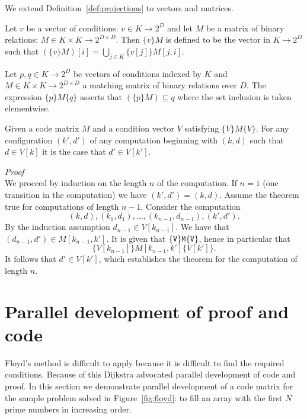 \documentclass[preprint,11pt]{elsarticle}
\begin{document}
We extend Definition~\ref{def:projections}
to vectors and matrices.
\begin{definition}\label{def:projVec}
Let $v$ be a vector of conditions: $v \in K \to 2^D$
and let $M$ be a matrix of binary relations:
$M \in K\times K \to 2^{D\times D}$.
Then $\{v\}M$ is defined to be the vector in $K \to 2^D$
such that
$(\{v\}M)[i] = \bigcup_{j\in K}\{v[j]\}M[j,i]$.  
\end{definition}

\begin{definition}
\label{def:braKet}
Let $p,q \in K \to 2^D$ be vectors of conditions
indexed by $K$
and $M \in K\times K \to 2^{D\times D}$
a matching matrix of binary relations over $D$.
The expression $\{p\}M\{q\}$
asserts that
$(\{p\}M) \subseteq q$
where the set inclusion is taken elementwise.
\end{definition}

\begin{theorem}\label{thm:Floyd}
Given a code matrix $M$
and a condition vector $V$ satisfying
$\{V\}M\{V\}$.
For any configuration $(k',d')$ of any computation beginning with
$(k,d)$ such that $d \in V[k]$ it is the case that
$d' \in V[k']$. 
\end{theorem}
\emph{Proof}\\
We proceed by induction on the length $n$ of the computation.
If $n=1$ (one transition in the computation) we have $(k',d')=(k,d)$.
Assume the theorem true for computations of length $n-1$.
Consider the computation
$$
(k,d),
(k_1,d_1),
\ldots,
(k_{n-1},d_{n-1}),
(k',d').
$$
By the induction assumption $d_{n-1} \in V[k_{n-1}]$. 
We have that $(d_{n-1},d') \in M[k_{n-1},k']$.
It is given that ${\tt \{V\}M\{V\}}$,
hence in particular that
$$\{V[k_{n-1}]\}M[k_{n-1},k']\{V[k']\}.$$
It follows that $d' \in V[k']$, which establishes
the theorem for the computation of length $n$.

\section{Parallel development of proof and code}
\label{sec:sys}

Floyd's method is difficult to apply
because it is difficult to find the required conditions.
Because of this Dijkstra \cite{djk68a,djkInfotech71}
advocated parallel development of code and proof.
In this section we demonstrate parallel development
of a code matrix for the sample problem
solved in Figure~\ref{fig:floyd}:
to fill an array with the first $N$ prime numbers
in increasing order.
\end{document}
